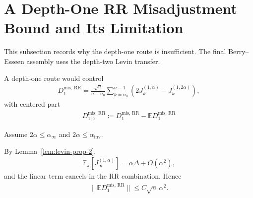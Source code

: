 
\section{A Depth-One RR Misadjustment Bound and Its Limitation}

This subsection records why the depth-one route is insufficient. The final
Berry--Esseen assembly uses the depth-two Levin transfer.

A depth-one route would control
\begin{equation}
\begin{aligned}
D_1^{\text{mis, RR}}
  = \frac{\sqrt{n}}{n - n_0} \sum_{k=n_0}^{n-1}
    (2 J_k^{(1, \alpha)} - J_k^{(1, 2 \alpha)}),
\end{aligned}
\end{equation}
with centered part
\begin{equation}
\begin{aligned}
D_{1, \text{c}}^{\text{mis, RR}}
  \coloneqq D_1^{\text{mis, RR}} - \mathbb{E} D_1^{\text{mis, RR}}
\end{aligned}
\end{equation}

Assume \(2 \alpha \le \alpha_\infty\) and \(2 \alpha \le \alpha_{\text{inv}}\).

By Lemma~\ref{lem:levin-prop-2},
\begin{equation}
\begin{aligned}
\mathbb{E}_\pi \left[J_\infty^{(1, \alpha)}\right] = \alpha \Delta + O(\alpha^2),
\end{aligned}
\end{equation}
and the linear term cancels in the RR combination. Hence
\begin{equation}
\begin{aligned}
\lVert \mathbb{E} D_1^{\text{mis, RR}} \rVert \le C \sqrt{n} \, \alpha^2.
\end{aligned}
\end{equation}

